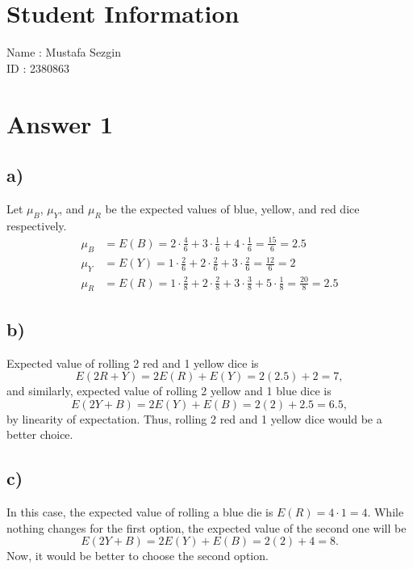 \documentclass[12pt]{article}
\begin{document}
\section*{Student Information}

Name : Mustafa Sezgin \\

ID : 2380863 \\


\section*{Answer 1}

\subsection*{a)}
Let $\mu_{B}$, $\mu_{Y}$, and $\mu_{R}$ be the expected values of blue, yellow, and red dice respectively.
\begin{align*}
    \mu_{B} &= E(B) = 2 \cdot \frac{4}{6} + 3 \cdot \frac{1}{6} + 4 \cdot \frac{1}{6} = \frac{15}{6} = 2.5 \\
    \mu_{Y} &= E(Y) = 1 \cdot \frac{2}{6} + 2 \cdot \frac{2}{6} + 3 \cdot \frac{2}{6} = \frac{12}{6} = 2 \\
    \mu_{R} &= E(R) = 1 \cdot \frac{2}{8} + 2 \cdot \frac{2}{8} + 3 \cdot \frac{3}{8} + 5 \cdot \frac{1}{8} = \frac{20}{8} = 2.5
\end{align*}

\subsection*{b)}
Expected value of rolling 2 red and 1 yellow dice is
\[ E(2R + Y) = 2 E(R) + E(Y) = 2 (2.5) + 2 = 7, \]
and similarly, expected value of rolling 2 yellow and 1 blue dice is
\[ E(2Y + B) = 2 E(Y) + E(B) = 2 (2) + 2.5 = 6.5, \]
by linearity of expectation. Thus, rolling 2 red and 1 yellow dice would be a better choice.

\subsection*{c)}
In this case, the expected value of rolling a blue die is $E(R) = 4 \cdot 1 = 4$. While nothing changes for the first option, the expected value of the second one will be
\[ E(2Y + B) = 2 E(Y) + E(B) = 2 (2) + 4 = 8. \]
Now, it would be better to choose the second option.
\end{document}
